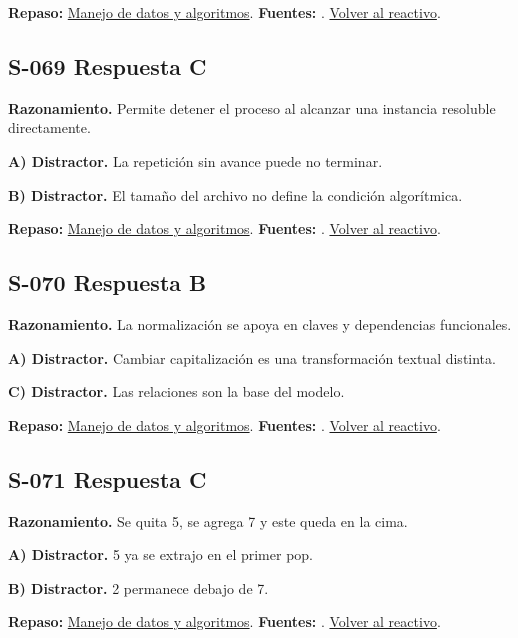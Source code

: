 \textbf{Repaso:} \hyperref[sec:s3]{Manejo de datos y algoritmos}. \textbf{Fuentes:} \cite{algorithms,postgres,ai}. \hyperref[q:S-068]{Volver al reactivo}.\par\medskip

\subsection*{S-069 \quad Respuesta C}\label{s:S-069}
\textbf{Razonamiento.} Permite detener el proceso al alcanzar una instancia resoluble directamente.

\textbf{A) Distractor. }La repetición sin avance puede no terminar.

\textbf{B) Distractor. }El tamaño del archivo no define la condición algorítmica.

\textbf{Repaso:} \hyperref[sec:s3]{Manejo de datos y algoritmos}. \textbf{Fuentes:} \cite{algorithms,postgres,ai}. \hyperref[q:S-069]{Volver al reactivo}.\par\medskip

\subsection*{S-070 \quad Respuesta B}\label{s:S-070}
\textbf{Razonamiento.} La normalización se apoya en claves y dependencias funcionales.

\textbf{A) Distractor. }Cambiar capitalización es una transformación textual distinta.

\textbf{C) Distractor. }Las relaciones son la base del modelo.

\textbf{Repaso:} \hyperref[sec:s3]{Manejo de datos y algoritmos}. \textbf{Fuentes:} \cite{algorithms,postgres,ai}. \hyperref[q:S-070]{Volver al reactivo}.\par\medskip

\subsection*{S-071 \quad Respuesta C}\label{s:S-071}
\textbf{Razonamiento.} Se quita 5, se agrega 7 y este queda en la cima.

\textbf{A) Distractor. }5 ya se extrajo en el primer pop.

\textbf{B) Distractor. }2 permanece debajo de 7.

\textbf{Repaso:} \hyperref[sec:s3]{Manejo de datos y algoritmos}. \textbf{Fuentes:} \cite{algorithms,postgres,ai}. \hyperref[q:S-071]{Volver al reactivo}.\par\medskip

